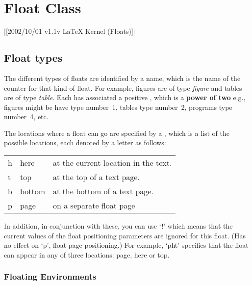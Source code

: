 \chapter{Float Class}
\label{ch:ltfloat}

|[2002/10/01 v1.1v LaTeX Kernel (Floats)]|

 \section{Float types}

  The different types of floats are identified by a  name,
  which is the name of the counter for that kind of float.  For
  example, figures are of type \emph{figure} and tables are of type \emph{table}.
  Each  has associated a positive , which
  is a \textbf{power of two}  e.g.,\\
  figures might be have type number~1, tables type number~2, programs
  type number~4, etc.

  The locations where a float can go are specified by a
  , which is a list of the possible
  locations, each denoted by a letter as follows:
  
  \begin{center}
    \begin{tabular}{l@{ : }l@{ --- }l}
     h & here   & at the current location in the text.\\
     t & top    & at the top of a text page.\\
     b & bottom & at the bottom of a text page.\\
     p & page   & on a separate float page
    \end{tabular}
  \end{center}
  
  In addition, in conjunction with these, you can use `!' which means
  that the current values of the float positioning parameters are
  ignored for this float. (Has no effect on `p', float page
  positioning.)
  For example, `pht' specifies that the float can appear in any of
  three locations: page, here or top.


 \subsection{Floating Environments}
    \begin{teX}
    \end{teX}


